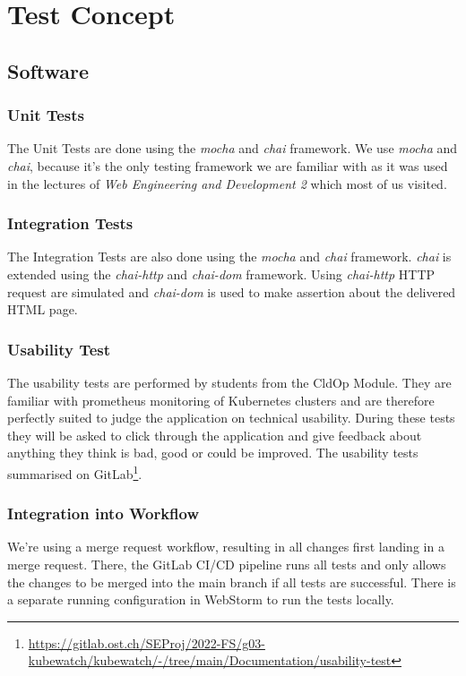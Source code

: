 \chapter{Test Concept}

\section{Software}
\subsection{Unit Tests}
The Unit Tests are done using the \textit{mocha} and \textit{chai} framework. We use \textit{mocha} and \textit{chai}, because it's the only testing framework we are familiar with as it was used in the lectures of \textit{Web Engineering and Development 2} which most of us visited.

\subsection{Integration Tests}
The Integration Tests are also done using the \textit{mocha} and \textit{chai} framework.
\textit{chai} is extended using the \textit{chai-http} and \textit{chai-dom} framework.
Using \textit{chai-http} HTTP request are simulated and \textit{chai-dom} is used to make assertion about the delivered HTML page.

\subsection{Usability Test}
The usability tests are performed by students from the CldOp Module.
They are familiar with prometheus monitoring of Kubernetes clusters and are therefore perfectly suited to judge the application on technical usability.
During these tests they will be asked to click through the application
and give feedback about anything they think is bad, good or could be improved.
The usability tests summarised on GitLab\footnote{\url{https://gitlab.ost.ch/SEProj/2022-FS/g03-kubewatch/kubewatch/-/tree/main/Documentation/usability-test}}.

\subsection{Integration into Workflow}
We're using a merge request workflow, resulting in all changes first landing in a merge request.
There, the GitLab CI/CD pipeline runs all tests and only allows the changes to be merged into the main branch if all tests are successful.
There is a separate running configuration in WebStorm to run the tests locally.

